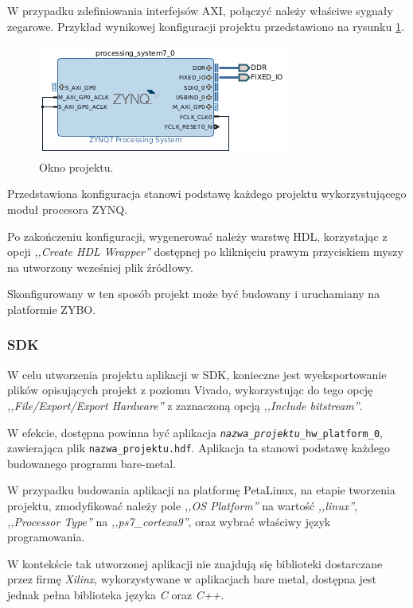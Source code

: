 W przypadku zdefiniowania interfejsów AXI, połączyć należy właściwe sygnały zegarowe. Przykład wynikowej konfiguracji projektu przedstawiono na rysunku \ref{fig:vivado-config-result}.

	\begin{figure}[ht]
		\centering
		\includegraphics[]{img/vivado/vivado-config-result.png}
		\caption{Okno projektu.}
		\label{fig:vivado-config-result}
	\end{figure}
	
Przedstawiona konfiguracja stanowi podstawę każdego projektu wykorzystującego moduł procesora ZYNQ.

Po zakończeniu konfiguracji, wygenerować należy warstwę HDL, korzystając z opcji \emph{,,Create HDL Wrapper''} dostępnej po kliknięciu prawym przyciskiem myszy na utworzony wcześniej plik źródłowy.

Skonfigurowany w ten sposób projekt może być budowany i uruchamiany na platformie ZYBO.
\subsubsection{SDK}

W celu utworzenia projektu aplikacji w SDK, konieczne jest wyeksportowanie plików opisujących projekt z poziomu Vivado, wykorzystując do tego opcję \emph{,,File/Export/Export Hardware''} z zaznaczoną opcją \emph{,,Include bitstream''}.

W efekcie, dostępna powinna być aplikacja \texttt{\textit{nazwa\_projektu}\_hw\_platform\_0}, zawierająca plik \texttt{nazwa\_projektu.hdf}. Aplikacja ta stanowi podstawę każdego budowanego programu bare-metal.

W przypadku budowania aplikacji na platformę PetaLinux, na etapie tworzenia projektu, zmodyfikować należy pole \emph{,,OS Platform''} na wartość \emph{,,linux''}, \emph{,,Processor Type''} na \emph{,,ps7\_cortexa9''}, oraz wybrać właściwy język programowania.

W kontekście tak utworzonej aplikacji nie znajdują się biblioteki dostarczane przez firmę \emph{Xilinx}, wykorzystywane w aplikacjach bare metal, dostępna jest jednak pełna biblioteka języka \emph{C} oraz \emph{C++}.

